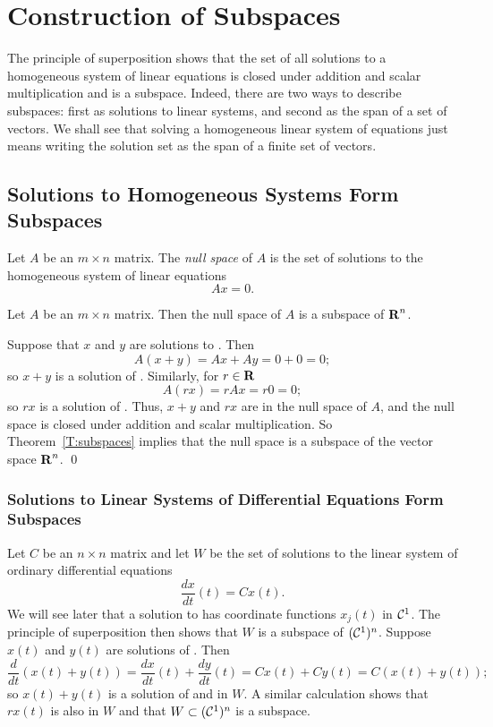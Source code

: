 \documentclass{ximera}
\begin{document}
\section{Construction of Subspaces} \label{S:5.2}

The principle of superposition shows that the set of all
solutions to a homogeneous system of linear equations is closed under 
addition and scalar multiplication and is a
subspace.  Indeed, there are two ways to describe subspaces:
first as solutions to linear systems, and second as the span of
a set of vectors.  We shall see that solving a homogeneous linear system of
equations just means writing the solution set as the span of a
finite set of vectors.

\subsection*{Solutions to Homogeneous Systems Form Subspaces}
 

\begin{Def} \label{D:nullspace}
Let $A$ be an $m\times n$ matrix.  The {\em null space\/} of $A$
is the set of solutions to the homogeneous system of linear equations
\begin{equation} \label{Ax=0}
Ax=0.
\end{equation}
\end{Def} 

\begin{lemma}
Let $A$ be an $m\times n$ matrix.  Then the null space of $A$
is a subspace of $\mbox{$\bf{R}$}^n$.
\end{lemma}

\proof
Suppose that $x$ and $y$ are solutions to .  Then
\[
A(x+y) = Ax+Ay = 0+0 = 0;
\]
so $x+y$ is a solution of .  Similarly, for $r\in\mbox{$\bf{R}$}$
\[
A(rx) = rAx = r0 = 0;
\]
so $rx$ is a solution of .  Thus, $x+y$ and $rx$ are
in the null space of $A$, and the null space is closed under addition 
and scalar multiplication.  So Theorem~\ref{T:subspaces} implies that
the null space is a subspace of the vector space $\mbox{$\bf{R}$}^n$.   \qed

\subsubsection*{Solutions to Linear Systems of Differential Equations Form
Subspaces}

Let $C$ be an $n\times n$ matrix and let $W$ be the set of solutions to
the linear system of ordinary differential equations
\begin{equation} \label{Cx(t)}
\frac{dx}{dt}(t) = Cx(t).
\end{equation}
We will see later that a solution to  has coordinate
functions $x_j(t)$ in ${\cal C}^1$.  The principle of superposition
then shows that $W$ is a subspace of $({\cal C}^1)^n$.  Suppose
$x(t)$ and $y(t)$ are solutions of .  Then
\[
\frac{d}{dt}(x(t)+y(t)) = \frac{dx}{dt}(t) + \frac{dy}{dt}(t) =
Cx(t) + Cy(t) = C(x(t)+y(t));
\]
so $x(t)+y(t)$ is a solution of  and in $W$.  A
similar calculation shows that $rx(t)$ is also in $W$ and
that $W\subset({\cal C}^1)^n$ is a subspace.
\end{document}
